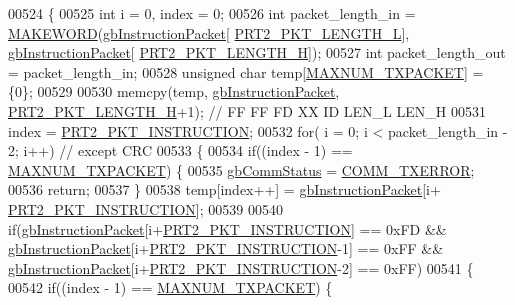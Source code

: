 \begin{DoxyCode}
00524 \{
00525     \textcolor{keywordtype}{int} i = 0, index = 0;
00526     \textcolor{keywordtype}{int} packet\_length\_in = \hyperlink{dynamixel_8h_a6b98c16b8e3e7733dd4063d0b0fac24c}{MAKEWORD}(\hyperlink{classdynamixel2_a298efe9115fdbf77019af1001e801fb4}{gbInstructionPacket}[
      \hyperlink{dynamixel_8h_a9e77ab568957b64786c810967dec8b0c}{PRT2\_PKT\_LENGTH\_L}], \hyperlink{classdynamixel2_a298efe9115fdbf77019af1001e801fb4}{gbInstructionPacket}[
      \hyperlink{dynamixel_8h_a5ea18a21d722bf72217d5408c4d2a868}{PRT2\_PKT\_LENGTH\_H}]);
00527     \textcolor{keywordtype}{int} packet\_length\_out = packet\_length\_in;
00528     \textcolor{keywordtype}{unsigned} \textcolor{keywordtype}{char} temp[\hyperlink{dxl__hal_8h_ad753363487043da5d9fdd3fd1071f59e}{MAXNUM\_TXPACKET}] = \{0\};
00529 
00530     memcpy(temp, \hyperlink{classdynamixel2_a298efe9115fdbf77019af1001e801fb4}{gbInstructionPacket}, \hyperlink{dynamixel_8h_a5ea18a21d722bf72217d5408c4d2a868}{PRT2\_PKT\_LENGTH\_H}+1);    \textcolor{comment}{// FF FF
       FD XX ID LEN\_L LEN\_H}
00531     index = \hyperlink{dynamixel_8h_aece9dd9d7c0fa1714d53c568865d79ad}{PRT2\_PKT\_INSTRUCTION};
00532     \textcolor{keywordflow}{for}( i = 0; i < packet\_length\_in - 2; i++)  \textcolor{comment}{// except CRC}
00533     \{
00534         \textcolor{keywordflow}{if}((index - 1) == \hyperlink{dxl__hal_8h_ad753363487043da5d9fdd3fd1071f59e}{MAXNUM\_TXPACKET}) \{
00535             \hyperlink{classdynamixel2_a703e327ba8ec5909c238dc94a00cb32d}{gbCommStatus} = \hyperlink{dynamixel_8h_a1bd7c7b30db4f56dc80cef65ad38afff}{COMM\_TXERROR};
00536             \textcolor{keywordflow}{return};
00537         \}
00538         temp[index++] = \hyperlink{classdynamixel2_a298efe9115fdbf77019af1001e801fb4}{gbInstructionPacket}[i+
      \hyperlink{dynamixel_8h_aece9dd9d7c0fa1714d53c568865d79ad}{PRT2\_PKT\_INSTRUCTION}];
00539 
00540         \textcolor{keywordflow}{if}(\hyperlink{classdynamixel2_a298efe9115fdbf77019af1001e801fb4}{gbInstructionPacket}[i+\hyperlink{dynamixel_8h_aece9dd9d7c0fa1714d53c568865d79ad}{PRT2\_PKT\_INSTRUCTION}] == 0xFD && 
      \hyperlink{classdynamixel2_a298efe9115fdbf77019af1001e801fb4}{gbInstructionPacket}[i+\hyperlink{dynamixel_8h_aece9dd9d7c0fa1714d53c568865d79ad}{PRT2\_PKT\_INSTRUCTION}-1] == 0xFF && 
      \hyperlink{classdynamixel2_a298efe9115fdbf77019af1001e801fb4}{gbInstructionPacket}[i+\hyperlink{dynamixel_8h_aece9dd9d7c0fa1714d53c568865d79ad}{PRT2\_PKT\_INSTRUCTION}-2] == 0xFF)
00541         \{   
00542             \textcolor{keywordflow}{if}((index - 1) == \hyperlink{dxl__hal_8h_ad753363487043da5d9fdd3fd1071f59e}{MAXNUM\_TXPACKET}) \{

\end{DoxyCode}
